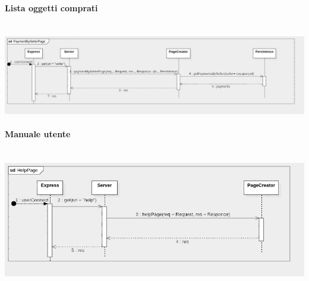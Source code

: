 \documentclass[a4paper, 12pt]{article}
\begin{document}
\paragraph{Lista oggetti comprati}\\
\includegraphics[width=1.0\textwidth]{seller}

\paragraph{Manuale utente}\\
\includegraphics[width=1.0\textwidth]{help}
\end{document}
